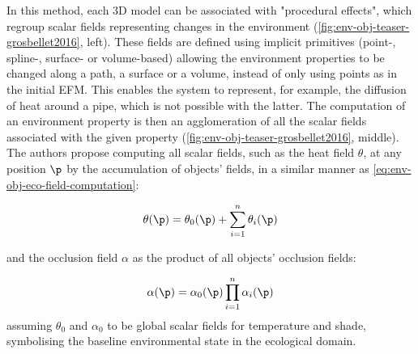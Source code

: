 In this method, each 3D model can be associated with "procedural effects", which regroup scalar fields representing changes in the environment (\cref{fig:env-obj-teaser-grosbellet2016}, left). These fields are defined using implicit primitives (point-, spline-, surface- or volume-based) allowing the environment properties to be changed along a path, a surface or a volume, instead of only using points as in the initial EFM. This enables the system to represent, for example, the diffusion of heat around a pipe, which is not possible with the latter. The computation of an environment property is then an agglomeration of all the scalar fields associated with the given property (\cref{fig:env-obj-teaser-grosbellet2016}, middle). The authors propose computing all scalar fields, such as the heat field $\theta$, at any position $\p$ by the accumulation of objects' fields, in a similar manner as \cref{eq:env-obj-eco-field-computation}:

\begin{align}
    \theta(\p) = \theta_0(\p) + \sum_{i=1}^{n}{ \theta_i(\p)}
\end{align}

and the occlusion field $\alpha$ as the product of all objects' occlusion fields:

\begin{align}
    \alpha(\p) = \alpha_0(\p) \prod_{i=1}^{n}{\alpha_i(\p)}
\end{align}
assuming $\theta_0$ and $\alpha_0$ to be global scalar fields for temperature and shade, symbolising the baseline environmental state in the ecological domain.


